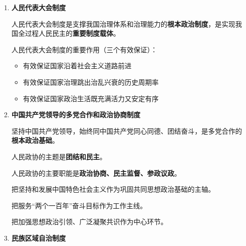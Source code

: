 \documentclass[12pt, a4paper, oneside]{ctexart}
\begin{document}
\begin{enumerate}
  \item {\bf 人民代表大会制度}
  
  人民代表大会制度是支撑我国治理体系和治理能力的\textbf{根本政治制度}，是实现我国全过程人民民主的\textbf{重要制度载体}。

  人民代表大会制度的重要作用（三个有效保证）：
  \begin{itemize}
    \item 有效保证国家沿着社会主义道路前进
    \item 有效保证国家治理跳出治乱兴衰的历史周期率
    \item 有效保证国家政治生活既充满活力又安定有序
  \end{itemize}

  \item {\bf 中国共产党领导的多党合作和政治协商制度}
  
  坚持中国共产党领导，始终同中国共产党同心同德、团结奋斗，是多党合作的\textbf{根本政治基础}。

  人民政协的主题是\textbf{团结和民主}。

  人民政协的主要职能是\textbf{政治协商、民主监督、参政议政}。

  把坚持和发展中国特色社会主义作为巩固共同思想政治基础的主轴。

  把服务“两个一百年”奋斗目标作为工作主线。

  把加强思想政治引领、广泛凝聚共识作为中心环节。

  \item {\bf 民族区域自治制度}
  
  
\end{enumerate}
\end{document}
